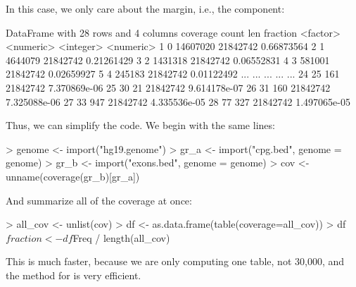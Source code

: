 \documentclass[10pt]{article}
\begin{document}
In this case, we only care about the margin, i.e., the 
component:
\begin{Schunk}
\begin{Soutput}
DataFrame with 28 rows and 4 columns
    coverage     count       len     fraction
    <factor> <numeric> <integer>    <numeric>
1          0  14607020  21842742   0.66873564
2          1   4644079  21842742   0.21261429
3          2   1431318  21842742   0.06552831
4          3    581001  21842742   0.02659927
5          4    245183  21842742   0.01122492
...      ...       ...       ...          ...
24        25       161  21842742 7.370869e-06
25        30        21  21842742 9.614178e-07
26        31       160  21842742 7.325088e-06
27        33       947  21842742 4.335536e-05
28        77       327  21842742 1.497065e-05
\end{Soutput}
\end{Schunk}

Thus, we can simplify the code. We begin with the same lines:
\begin{Schunk}
\begin{Sinput}
> genome <- import("hg19.genome")
> gr_a <- import("cpg.bed", genome = genome)
> gr_b <- import("exons.bed", genome = genome)
> cov <- unname(coverage(gr_b)[gr_a])
\end{Sinput}
\end{Schunk}
And summarize all of the coverage at once:
\begin{Schunk}
\begin{Sinput}
> all_cov <- unlist(cov)
> df <- as.data.frame(table(coverage=all_cov))
> df$fraction <- df$Freq / length(all_cov)
\end{Sinput}
\end{Schunk}
This is much faster, because we are only computing one table, not
30,000, and the  method for  is very
efficient.
\end{document}

